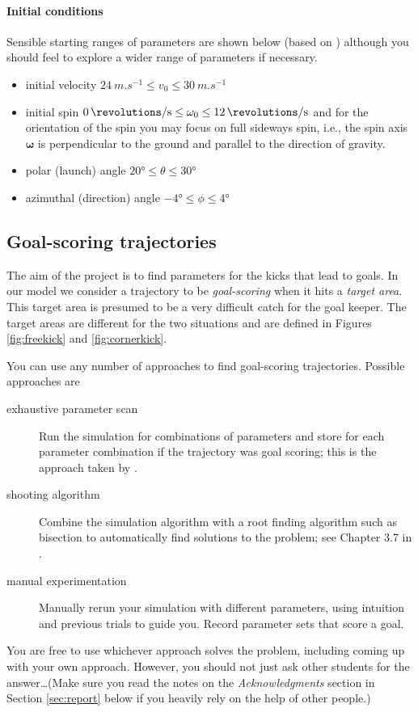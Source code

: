 \documentclass[letterpaper]{scrartcl}
\begin{document}
\paragraph{Initial conditions}

Sensible starting ranges of parameters are shown below (based on
\citet{Cook:2006aa}) although you should feel to explore a wider range
of parameters if necessary.
\begin{itemize}
\item initial velocity $\SI{24}{m.s^{-1}} \le v_{0} \le
  \SI{30}{m.s^{-1}}$
\item initial spin
  $\SI{0}{\revolutions\per\second} \le \omega_{0} \le
  \SI{12}{\revolutions\per\second}$ and for the orientation of the
  spin you may focus on full sideways spin, i.e., the spin axis
  $\boldsymbol{\omega}$ is perpendicular to the ground and parallel to
  the direction of gravity.
\item polar (launch) angle $\ang{20} \le \theta \le \ang{30}$
\item azimuthal (direction) angle $\ang{-4} \le \phi \le \ang{4}$
\end{itemize}


\subsection{Goal-scoring trajectories}
\label{sec:scoring}

The aim of the project is to find parameters for the kicks that lead
to goals. In our model we consider a trajectory to be
\emph{goal-scoring} when it hits a \emph{target area}. This target
area is presumed to be a very difficult catch for the goal keeper. The
target areas are different for the two situations and are defined in
Figures \ref{fig:freekick} and \ref{fig:cornerkick}.

You can use any number of approaches to find goal-scoring
trajectories. Possible approaches are
\begin{description}
\item[exhaustive parameter scan] Run the simulation for combinations
  of parameters and store for each parameter combination if the
  trajectory was goal scoring; this is the approach taken by
  \citet{Cook:2006aa}.
\item[shooting algorithm] Combine the simulation algorithm with a root
  finding algorithm such as bisection to automatically find solutions
  to the problem; see Chapter 3.7 in \citet{Wang:2015aa}.
\item[manual experimentation] Manually rerun your simulation with
  different parameters, using intuition and previous trials to guide
  you. Record parameter sets that score a goal.
\end{description}
You are free to use whichever approach solves the problem, including
coming up with your own approach. However, you should not just ask
other students for the answer\dots (Make sure you read the notes on
the \emph{Acknowledgments} section in Section \ref{sec:report} below
if you heavily rely on the help of other people.)
\end{document}
